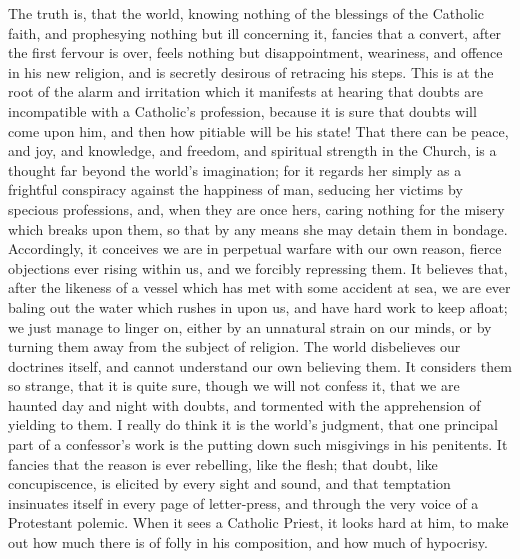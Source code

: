 The truth is, that the world, knowing nothing of the blessings of
the Catholic faith, and prophesying nothing but ill concerning it,
fancies that a convert, after the first fervour is over, feels nothing
but disappointment, weariness, and offence in his new religion, and is
secretly desirous of retracing his steps. This is at the root of the
alarm and irritation which it manifests at hearing that doubts are
incompatible with a Catholic's profession, because it is sure that
doubts will come upon him, and then how pitiable will be his state!
That there can be peace, and joy, and knowledge, and freedom, and
spiritual strength in the Church, is a thought far beyond the world's
imagination; for it regards her simply as a frightful conspiracy
against the happiness of man, seducing her victims by specious
professions, and, when they are once hers, caring nothing for the
misery which breaks upon them, so that by any means she may detain
them in bondage. Accordingly, it conceives we are in perpetual warfare
with our own reason, fierce objections ever rising within us, and we
forcibly repressing them. It believes that, after the likeness of a
vessel which has met with some accident at sea, we are ever baling out
the water which rushes in upon us, and have hard work to keep afloat;
we just manage to linger on, either by an unnatural strain on our
minds, or by turning them away from the subject of religion. The world
disbelieves our doctrines itself, and cannot understand our own
believing them. It considers them so strange, that it is quite sure,
though we will not confess it, that we are haunted day and night with
doubts, and tormented with the apprehension of yielding to them. I
really do think it is the world's judgment, that one principal part of
a confessor's work is the putting down such misgivings in his
penitents. It fancies that the reason is ever rebelling, like the
flesh; that doubt, like concupiscence, is elicited by every sight and
sound, and that temptation insinuates itself in every page of
letter-press, and through the very voice of a Protestant polemic. When
it sees a Catholic Priest, it looks hard at him, to make out how much
there is of folly in his composition, and how much of hypocrisy.

